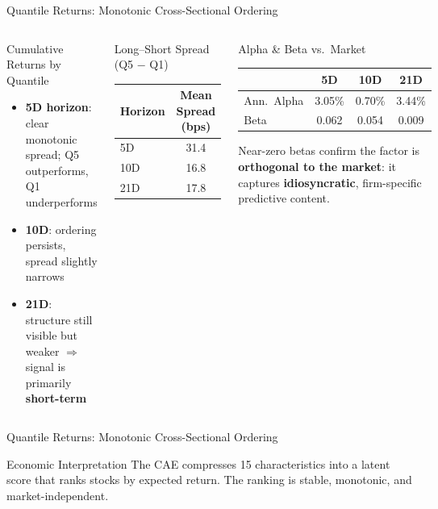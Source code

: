 \documentclass[aspectratio=169, 11pt]{beamer}
\begin{document}
\begin{frame}{Quantile Returns: Monotonic Cross-Sectional Ordering}

\begin{columns}[T]
\begin{block}{Cumulative Returns by Quantile}
\begin{itemize}
  \item \textbf{5D horizon}: clear monotonic spread; Q5 outperforms, Q1 underperforms
  \item \textbf{10D}: ordering persists, spread slightly narrows
  \item \textbf{21D}: structure still visible but weaker $\Rightarrow$ signal is primarily \textbf{short-term}
\end{itemize}
\end{block}
\vspace{-.3cm}
\begin{block}{Long--Short Spread (Q5 $-$ Q1)}
\centering\small
\begin{tabular}{lc}
\toprule
Horizon & Mean Spread (bps) \\
\midrule
5D & 31.4 \\
10D & 16.8 \\
21D & 17.8 \\
\bottomrule
\end{tabular}
\end{block}

\begin{block}{Alpha \& Beta vs.\ Market}
\centering\small
\begin{tabular}{lccc}
\toprule
& 5D & 10D & 21D \\
\midrule
Ann.\ Alpha & 3.05\% & 0.70\% & 3.44\% \\
Beta & 0.062 & 0.054 & 0.009 \\
\bottomrule
\end{tabular}

\medskip
\raggedright
Near-zero betas confirm the factor is \textbf{orthogonal to the market}: it captures \textbf{idiosyncratic}, firm-specific predictive content.
\end{block}
\end{columns}
\end{frame}
%
%
\begin{frame}{Quantile Returns: Monotonic Cross-Sectional Ordering}
\vspace{0.5cm}
\begin{exampleblock}{Economic Interpretation}
The CAE compresses 15 characteristics into a latent score that ranks stocks by expected return. The ranking is stable, monotonic, and market-independent.
\end{exampleblock}
\end{frame}
\end{document}
